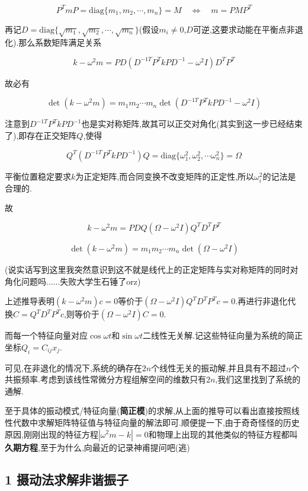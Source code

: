 \documentclass[UTF8]{article}
\begin{document}
	\[P^TmP=\mathrm{diag}\{m_1,m_2,\cdots,m_n\}=M\quad\Leftrightarrow\quad m=PMP^T\]
	
	再记$D=\mathrm{diag}\{\sqrt{m_1},\sqrt{m_2},\cdots,\sqrt{m_n}\}$(假设$m_i\ne0$,$D$可逆,这要求动能在平衡点非退化).那么系数矩阵满足关系
	
	\[k-\omega^2m=PD(D^{-1T}P^TkPD^{-1}-\omega^2I)D^TP^T\]
	
	故必有
	
	\[\det(k-\omega^2m)=m_1m_2\cdots m_n\det(D^{-1T}P^TkPD^{-1}-\omega^2I)\]

	注意到$D^{-1T}P^TkPD^{-1}$也是实对称矩阵,故其可以正交对角化(其实到这一步已经结束了),即存在正交矩阵$Q$,使得
	
	\[Q^T(D^{-1T}P^TkPD^{-1})Q=\mathrm{diag}\{\omega_1^2,\omega_2^2,\cdots\omega_n^2\}=\Omega\]
	
	平衡位置稳定要求$k$为正定矩阵,而合同变换不改变矩阵的正定性,所以$\omega_i^2$的记法是合理的.
	
	故
	
	\[k-\omega^2m=PDQ(\Omega-\omega^2I)Q^TD^TP^T\]
	
	\[\det(k-\omega^2m)=m_1m_2\cdots m_n\det(\Omega-\omega^2I)\]
	
	(说实话写到这里我突然意识到这不就是线代上的正定矩阵与实对称矩阵的同时对角化问题吗......失败大学生石锤了orz)
	
	上述推导表明$(k-\omega^2m)c=0$等价于$(\Omega-\omega^2I)Q^TD^TP^Tc=0$.再进行非退化代换$C=Q^TD^TP^Tc$,则等价于$(\Omega-\omega^2I)C=0$.
	
	而每一个特征向量对应$\cos\omega t$和$\sin \omega t$二线性无关解.记这些特征向量为系统的简正坐标$Q_i=C_{ij}x_j$.
	
	可见,在非退化的情况下,系统的确存在$2n$个线性无关的振动解,并且具有不超过$n$个共振频率.考虑到该线性常微分方程组解空间的维数只有$2n$,我们这里找到了系统的通解.
	
	至于具体的振动模式/特征向量(\textbf{简正模})的求解,从上面的推导可以看出直接按照线性代数中求解矩阵特征值与特征向量的解法即可.顺便提一下,由于奇奇怪怪的历史原因,刚刚出现的特征方程$|\omega^2m-k|=0$和物理上出现的其他类似的特征方程都叫\textbf{久期方程},至于为什么,向最近的记录神甫提问吧(逃)
	
	\newpage
	
	
	
	
	
	
	
	\subsection*{1 摄动法求解非谐振子}
	
\end{document}
